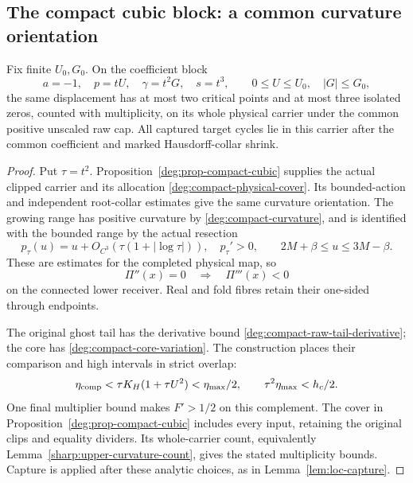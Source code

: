 \subsection{The compact cubic block: a common curvature orientation}
\label{sharp:upper-cubic-section}

\begin{proposition}
\label{sharp:upper-cubic}
Fix finite \(U_0,G_0\). On the coefficient block
\begin{equation}\label{sharp:upper-cubic-block}
 a=-1,\quad p=tU,\quad\gamma=t^2G,\quad s=t^3,
             \qquad0\le U\le U_0,\quad |G|\le G_0,
\end{equation}
the same displacement has at most two critical points and at most three
isolated zeros, counted with multiplicity, on its whole physical carrier
under the common positive unscaled raw cap. All captured target cycles
lie in this carrier after the common coefficient and marked
Hausdorff-collar shrink.
\end{proposition}

\begin{proof}
Put \(\tau=t^2\). Proposition~\ref{deg:prop-compact-cubic} supplies the
actual clipped carrier and its allocation \eqref{deg:compact-physical-cover}.
Its bounded-action and independent root-collar estimates give the same
curvature orientation. The growing range has positive curvature by
\eqref{deg:compact-curvature}, and is identified with the bounded
range by the actual resection
\begin{equation}\label{sharp:upper-cubic-overlap}
 p_\tau(u)=u+O_{C^3}(\tau(1+|\log\tau|)),\quad p_\tau'>0,
                \qquad2M+\beta\le u\le3M-\beta.
\end{equation}
These are estimates for the completed physical map, so
\begin{equation}\label{sharp:upper-cubic-common-crossing}
 \Pi''(x)=0\quad\Longrightarrow\quad\Pi'''(x)<0
\end{equation}
on the connected lower receiver. Real and fold fibres retain their
one-sided through endpoints.

The original ghost tail has the derivative bound
\eqref{deg:compact-raw-tail-derivative}; the core has
\eqref{deg:compact-core-variation}. The construction places
their comparison and high intervals in strict overlap:
\begin{equation}\label{sharp:upper-cubic-height-overlap}
 \eta_{\rm comp}<\tau K_H(1+\tau U^2)<\eta_{\max}/2,
                      \qquad\tau^2\eta_{\max}<h_c/2.
\end{equation}
One final multiplier bound makes \(F'>1/2\) on this complement.
The cover in Proposition~\ref{deg:prop-compact-cubic} includes every
input, retaining the original clips and equality dividers. Its whole-carrier
count, equivalently Lemma~\ref{sharp:upper-curvature-count}, gives
the stated multiplicity bounds. Capture is applied after these analytic
choices, as in Lemma~\ref{lem:loc-capture}.
\end{proof}
